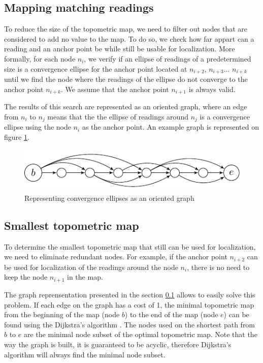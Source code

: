 \documentclass[letterpaper,10 pt,conference]{ieeeconf}
\begin{document}
\subsection{Mapping matching readings}
\label{matching-readings}
To reduce the size of the topometric map, we need to filter out nodes that are considered to add no
value to the map. To do so, we check how far appart can a reading and an anchor point be while still
be usable for localization. More formally, for each node $n_i$, we verify if an ellipse of readings
of a predetermined size is a convergence ellipse for the anchor point located at $n_{i+2}$,
$n_{i+3}$... $n_{i+k}$ until we find the node where the readings of the ellipse
do not converge to
the anchor point $n_{i+k}$. We assume that the anchor point $n_{i+1}$ is always valid.

The results of this search are represented as an oriented graph, where an edge from $n_{i}$ to
$n_{j}$ means that the the ellipse of readings around $n_{j}$ is a convergence ellipse using the
node $n_i$ as the anchor point. An example graph is represented on figure \ref{graph_unoptimized}.

\begin{figure}[thpb]
  \centering
  \includegraphics[scale=1.0]{unoptimized-graph}
  \caption{Representing convergence ellipses as an oriented graph}
  \label{graph_unoptimized}
\end{figure}


\subsection{Smallest topometric map}

To determine the smallest topometric map that still can be used for localization, we need to
eliminate redundant nodes.  For example, if the anchor point $n_{i+2}$ can be used for localization
of the readings around the node $n_i$, there is no need to keep the node $n_{i+1}$ in the map.

The graph reprensentation presented in the section \ref{matching-readings} allows to easily solve
this problem. If each edge on the graph has a cost of 1, the minimal topometric map from the
beginning of the map (node $b$) to the end of the map (node $e$) can be found using the Dijkstra's
algorithm \cite{dijkstra}. The nodes used on the shortest path from $b$ to $e$ are the minimal node
subset of the optimal topometric map. Note that the way the graph is built, it is guaranteed to be
acyclic, therefore Dijkstra's algorithm will always find the minimal node subset.
\end{document}
